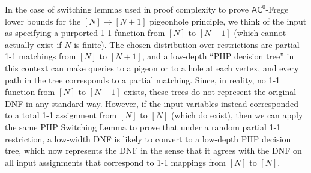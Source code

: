 \documentclass[11pt]{article}
\newcommand{\todo}[1]{\textcolor{red}{TODO: #1}}
\begin{document}
In the case of switching lemmas used in proof complexity to prove $\mathsf{AC^0}$-Frege lower bounds for the $[N] \to [N+1]$ pigeonhole principle, we think of the input as specifying a purported 1-1 function from $[N]$ to $[N+1]$ (which cannot actually 
exist if $N$ is finite).  
The chosen distribution over restrictions are partial 1-1 matchings from $[N]$ to $[N+1]$, and a low-depth ``PHP decision tree'' in this context can make queries to a pigeon or to a hole at each vertex, and every path in the tree corresponds to a partial matching. Since, in reality, no 1-1 function from $[N]$ to $[N+1]$ exists, these trees do not represent the original DNF in any standard way. However, if the input variables instead corresponded to a total 1-1 assignment from $[N]$ to $[N]$ (which do exist), then we can apply the same PHP Switching Lemma to prove that under a random partial 1-1 restriction, a low-width DNF is likely to convert to a low-depth PHP decision tree, which now represents the DNF in the sense that it agrees with the DNF on all input assignments that correspond to 1-1 mappings from $[N]$ to $[N]$. 

\end{document}
